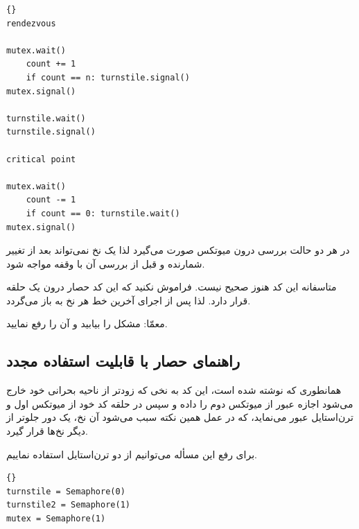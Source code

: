 \documentclass{book}
\newcommand{\clearemptydoublepage}{\newpage\cleardoublepage}
\begin{document}
\begin{latin}
\begin{lstlisting}[title=\rl{ ناراه‌حل حصار با قابلیت استفاده مجدد}]{} 
rendezvous

mutex.wait()
    count += 1
    if count == n: turnstile.signal()
mutex.signal()

turnstile.wait()
turnstile.signal()

critical point

mutex.wait()
    count -= 1
    if count == 0: turnstile.wait()
mutex.signal()
\end{lstlisting}
\end{latin}

    در هر دو حالت بررسی درون میوتکس صورت می‌گیرد لذا یک نخ نمی‌تواند بعد از تغییر شمارنده و قبل از بررسی آن با وقفه مواجه شود. 

    متاسفانه این کد هنوز صحیح نیست. فراموش نکنید که این کد حصار درون یک حلقه قرار دارد. لذا پس از اجرای آخرین خط 
    هر نخ به  باز می‌گردد. 

    معمّا: مشکل را بیابید و آن را رفع نمایید. 


\clearemptydoublepage
\subsection {راهنمای حصار با قابلیت استفاده مجدد}

    همانطوری که نوشته شده است،
    این کد به نخی که زودتر از ناحیه بحرانی خود خارج می‌شود اجازه عبور از میوتکس دوم را داده و سپس در حلقه کد خود از  میوتکس 
    اول و ترن‌استایل عبور می‌نماید، که در عمل همین نکته سبب می‌شود آن نخ، یک دور جلوتر از دیگر نخ‌ها قرار گیرد. 

    برای رفع این مسأله می‌توانیم از دو ترن‌استایل استفاده نماییم. 


\begin{latin}
\begin{lstlisting}[title=\rl{ راهنمای حصار با قابلیت استفاده مجدد}]{} 
turnstile = Semaphore(0)
turnstile2 = Semaphore(1)
mutex = Semaphore(1)
\end{lstlisting}
\end{latin}
\end{document}
